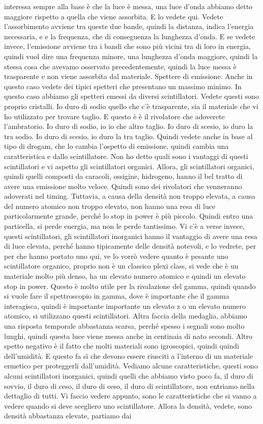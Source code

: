 interessa sempre alla base è che la luce è messa, una luce d'onda abbiamo detto maggiore rispetto a quella che viene assorbita. E lo vedete qui. Vedete l'assorbimento avviene tra queste due bande, quindi la distanza, indica l'energia necessaria, e e la frequenza, che di conseguenza la lunghezza d'onda. E se vedete invece, l'emissione avviene tra i bandi che sono più vicini tra di loro in energia, quindi vuol dire una frequenza minore, una lunghezza d'onda maggiore, quindi la stessa cosa che avevamo osservato precedentemente, quindi la luce messa è trasparente e non viene assorbita dal materiale. Spettere di emissione. Anche in questo caso vedete dei tipici spetteri che presentano un massimo minimo. In questo caso abbiamo gli spetteri emessi da diversi scintillatori. Vedete questi sono proprio cristalli. Io duro di sodio quello che c'è trasparente, sia il materiale che vi ho utilizzato per trovare taglio. E questo è è il rivolatore che adoverete l'ambratorio. Io duro di sodio, io io che altro taglio. Io duro di scesio, io duro la tra sodio. Io duro di scesio, io duro la tra taglio. Quindi vedete anche in base al tipo di drogam, che lo cambia l'ospetto di emissione, quindi cambia una caratteristica e dallo scintillatore. Non ho detto quali sono i vantaggi di questi scintillatori e vi aspetto gli scintillatori organici. Allora, gli scintillatori organici, quindi quelli composti da caracoli, ossigine, hidrogeno, hanno il bel tratto di avere una emissione molto veloce. Quindi sono dei rivolatori che venneranno adoverati nel timing. Tuttavia, a causa della densità non troppo elevata, a causa del numero atomico non troppo elevato, non hanno una resa di luce particolarmente grande, perché lo stop in power è più piccolo. Quindi entro una particella, si perde energia, ma non le perde tantissimo. Vi c'è a verse invece, questi scintillatori, gli scintillatori inorganici hanno il vantaggio di avere una resa di luce elevata, perché hanno tipicamente delle densità notevoli, e lo vedrete, per per che hanno portato uno qui, ve lo vorrò vedere quanto è pesante uno scintillatore organico, proprio non è un classico plexi class, si vede che è un materiale molto più denso, ha un elevato numero atomico e quindi un elevato stop in power. Questo è molto utile per la rivalazione del gamma, quindi quando si vuole fare il spettroscopio in gamma, dove è importante che il gamma interagisca, quindi è importante importante un elevato z o un elevato numero atomico, si utilizzano questi scintillatori. Altra faccia della medaglia, abbiamo una risposta temporale abbastanza scarsa, perché spesso i segnali sono molto lunghi, quindi questa luce viene messa anche in centinaia di nato secondi. Altro spetto negativo è il fatto che molti materiali sono igroscopici, quindi quindi dell'umidità. E questo fa sì che devono essere riusciti a l'interno di un materiale ermetico per proteggerli dall'umidità. Vediamo alcune caratteristiche, questi sono alcuni scintillatori inorganici, quindi quelli che abbiamo visto poco fa, il duro di sovvio, il duro di ceso, il duro di ceso, il duro di scintillatore, non entriamo nella dettaglio di tutti. Vi faccio vedere appunto, sono le caratteristiche che si vanno a vedere quando si deve scegliero uno scintillatore. Allora la densità, vedete, sono densità abbastanza elevate, partiamo dai 